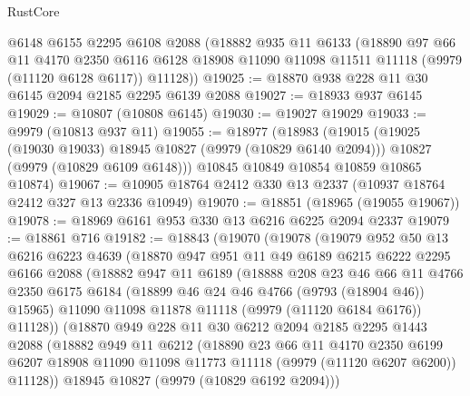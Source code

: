 \begin{lexlean}{RustCore}
\begin{coremodule}
    @6148
    @6155
    @2295
    @6108
    @2088
    (@18882
      @935
      @11
      @6133
      (@18890
        @97
        @66
        @11
        @4170
        @2350
        @6116
        @6128
        @18908
        @11090
        @11098
        @11511
        @11118
        (@9979 (@11120 @6128 @6117))
        @11128))
@19025 := @18870 @938 @228 @11 @30 @6145 @2094 @2185 @2295 @6139 @2088
@19027 := @18933 @937 @6145
@19029 := @10807 (@10808 @6145)
@19030 := @19027 @19029
@19033 := @9979 (@10813 @937 @11)
@19055 := @18977
    (@18983
      (@19015
        (@19025 (@19030 @19033) @18945 @10827 (@9979 (@10829 @6140 @2094)))
        @10827
        (@9979 (@10829 @6109 @6148)))
      @10845
      @10849
      @10854
      @10859
      @10865
      @10874)
@19067 := @10905 @18764 @2412 @330 @13 @2337 (@10937 @18764 @2412 @327 @13 @2336 @10949)
@19070 := @18851 (@18965 (@19055 @19067))
@19078 := @18969 @6161 @953 @330 @13 @6216 @6225 @2094 @2337
@19079 := @18861 @716
@19182 := @18843
    (@19070
      (@19078
        (@19079
          @952
          @50
          @13
          @6216
          @6223
          @4639
          (@18870
            @947
            @951
            @11
            @49
            @6189
            @6215
            @6222
            @2295
            @6166
            @2088
            (@18882
              @947
              @11
              @6189
              (@18888
                @208
                @23
                @46
                @66
                @11
                @4766
                @2350
                @6175
                @6184
                (@18899 @46 @24 @46 @4766 (@9793 (@18904 @46)) @15965)
                @11090
                @11098
                @11878
                @11118
                (@9979 (@11120 @6184 @6176))
                @11128))
            (@18870
              @949
              @228
              @11
              @30
              @6212
              @2094
              @2185
              @2295
              @1443
              @2088
              (@18882
                @949
                @11
                @6212
                (@18890
                  @23
                  @66
                  @11
                  @4170
                  @2350
                  @6199
                  @6207
                  @18908
                  @11090
                  @11098
                  @11773
                  @11118
                  (@9979 (@11120 @6207 @6200))
                  @11128))
              @18945
              @10827
              (@9979 (@10829 @6192 @2094)))

\end{coremodule}
\end{lexlean}
